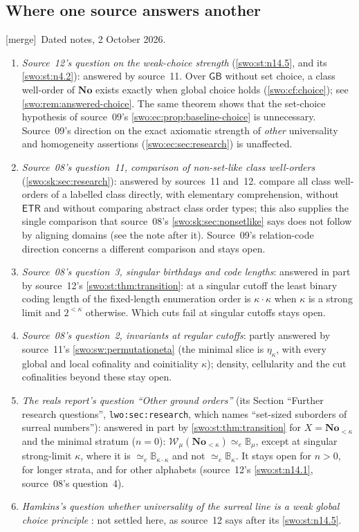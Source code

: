 \documentclass[11pt]{article}
\theoremstyle{definition}
\theoremstyle{remark}
\newcommand{\No}{\mathbf{No}}
\newcommand{\WO}{\mathcal W}
\newcommand{\B}{\mathbb B}
\newcommand{\equi}{\mathrel{\simeq_{\!e}}}
\newcommand{\GB}{\mathsf{GB}}
\newcommand{\ETR}{\mathsf{ETR}}
\newcommand{\code}[1]{\texttt{\small #1}}
\newcommand{\merge}{\textsf{[merge]}}
\begin{document}
\subsection{Where one source answers another}\label{swo:sec:answers}

\merge\ Dated notes, 2 October 2026.
\begin{enumerate}[label=(\alph*)]
\item \emph{Source~12's question on the weak-choice strength}
(\cref{swo:st:n14.5}, and its \cref{swo:st:n4.2}): answered by source~11.
Over $\GB$ without set choice, a class well-order of $\No$ exists exactly when
global choice holds (\cref{swo:cf:choice}); see \cref{swo:rem:answered-choice}.
The same theorem shows that the set-choice hypothesis of source~09's
\cref{swo:ec:prop:baseline-choice} is unnecessary. Source~09's direction on
the exact axiomatic strength of \emph{other} universality and homogeneity
assertions (\cref{swo:ec:sec:research}) is unaffected.
\item \emph{Source~08's question~11, comparison of non-set-like class
well-orders} (\cref{swo:sk:sec:research}): answered by sources~11 and~12.
 compare all class well-orders of a
labelled class directly, with elementary comprehension, without $\ETR$ and
without comparing abstract class order types; this also supplies the single
comparison that source~08's \cref{swo:sk:sec:nonsetlike} says does not follow
by aligning domains (see the note after it). Source~09's relation-code
direction concerns a different comparison and stays open.
\item \emph{Source~08's question~3, singular birthdays and code lengths}:
answered in part by source~12's \cref{swo:st:thm:transition}: at a singular
cutoff the least binary coding length of the fixed-length enumeration order is
$\kappa\cdot\kappa$ when $\kappa$ is a strong limit and $2^{<\kappa}$
otherwise. Which cuts fail at singular cutoffs stays open.
\item \emph{Source~08's question~2, invariants at regular cutoffs}: partly
answered by source~11's \cref{swo:sw:permutationeta} (the minimal slice is
$\eta_\kappa$, with every global and local cofinality and coinitiality
$\kappa$); density, cellularity and the cut cofinalities beyond these stay
open.
\item \emph{The reals report's question ``Other ground orders''}
(its Section ``Further research questions'', \code{lwo:sec:research}, which
names ``set-sized suborders of surreal numbers''): answered in part by
\cref{swo:st:thm:transition} for $X=\No_{<\kappa}$ and the minimal stratum
($n=0$): $\WO_\mu(\No_{<\kappa})\equi\B_\mu$, except at singular strong-limit
$\kappa$, where it is $\equi\B_{\kappa\cdot\kappa}$ and not $\equi\B_\kappa$.
It stays open for $n>0$, for longer strata, and for other alphabets
(source~12's \cref{swo:st:n14.1}, source~08's question~4).
\item \emph{Hamkins's question whether universality of the surreal line is a
weak global choice principle} \cite{HamkinsUnivChoice}: not settled here, as
source~12 says after its \cref{swo:st:n14.5}.
\end{enumerate}
\end{document}
